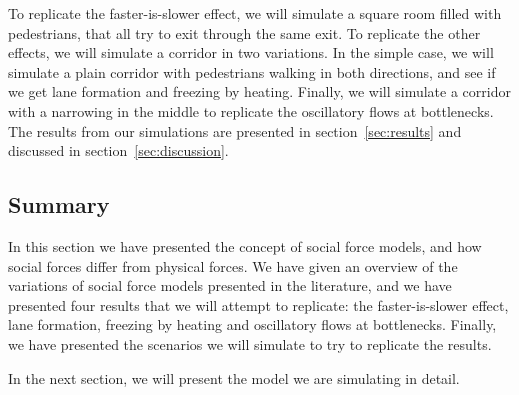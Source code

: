To replicate the faster-is-slower effect, we will simulate a square room 
filled with pedestrians, that all try to exit through the same exit. To 
replicate the other effects, we will simulate a corridor in two variations. In 
the simple case, we will simulate a plain corridor with pedestrians walking in 
both directions, and see if we get lane formation and freezing by heating.  
Finally, we will simulate a corridor with a narrowing in the middle to 
replicate the oscillatory flows at bottlenecks. The results from our 
simulations are presented in section~\ref{sec:results} and discussed in 
section~\ref{sec:discussion}.

\subsection{Summary}
In this section we have presented the concept of social force models, and how 
social forces differ from physical forces. We have given an overview of the 
variations of social force models presented in the literature, and we have 
presented four results that we will attempt to replicate: the faster-is-slower 
effect, lane formation, freezing by heating and oscillatory flows at 
bottlenecks. Finally, we have presented the scenarios we will simulate to try 
to replicate the results.

In the next section, we will present the model we are simulating in detail.
